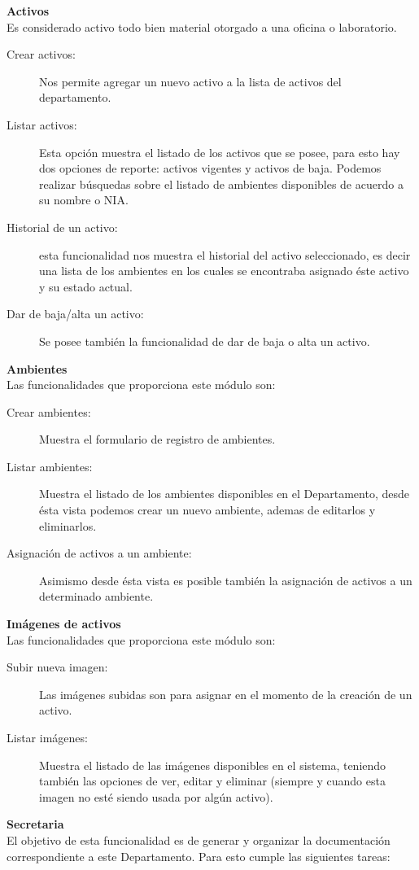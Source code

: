 \documentclass[10pt,letterpaper,twoside]{article}
\newcommand{\btext}[1]{
    \vspace{10mm}
    {{\textcolor{titlecolor}{\large{\textbf{\textsf{#1}}}}}}
    \vspace{5mm}
    \\
}
\newcommand{\ctext}[1]{
    \vspace{5mm}
    {{\textcolor{titlecolor}{\large{\textbf{\textsf{#1}}}}}}
    \\
}
\begin{document}
\begin{multicols}{2}
\ctext{Activos}
Es considerado activo todo bien material otorgado a una oficina o laboratorio.
\begin{description}
    \item [Crear activos:] Nos permite agregar un nuevo activo a la lista de activos del departamento.
    \item [Listar activos:] Esta opción muestra el listado de los activos que se posee, para esto hay dos opciones de reporte: activos vigentes y activos de baja. Podemos realizar búsquedas sobre el listado de ambientes disponibles de acuerdo a su nombre o NIA.
    \item [Historial de un activo:] esta funcionalidad nos muestra el historial del activo seleccionado, es decir una lista de los ambientes en los cuales se encontraba asignado éste activo y su estado actual.
    \item [Dar de baja/alta un activo:] Se posee también la funcionalidad de dar de baja o alta un activo.
\end{description}

\ctext{Ambientes}
Las funcionalidades que proporciona este módulo son:
\begin{description}
    \item [Crear ambientes:] Muestra el formulario de registro de ambientes.
    \item [Listar ambientes:] Muestra el listado de los ambientes disponibles en el Departamento, desde ésta vista podemos crear un nuevo ambiente, ademas de editarlos y eliminarlos.
    \item [Asignación de activos a un ambiente:] Asimismo desde ésta vista es posible también la asignación de activos a un determinado ambiente.
\end{description}

\ctext{Imágenes de activos}
Las funcionalidades que proporciona este módulo son:
\begin{description}
    \item [Subir nueva imagen:] Las imágenes subidas son para asignar en el momento de la creación de un activo.
    \item [Listar imágenes:] Muestra el listado de las imágenes disponibles en el sistema, teniendo también las opciones de ver, editar y eliminar (siempre y cuando esta imagen no esté siendo usada por algún activo).
\end{description}

\btext{Secretaria}
El objetivo de esta funcionalidad es de generar y organizar la documentación correspondiente a este
Departamento. Para esto cumple las siguientes tareas:


\end{multicols}
\end{document}
